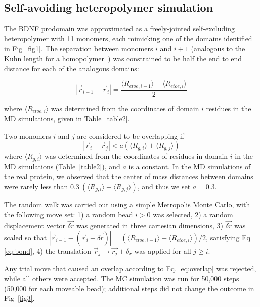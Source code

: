 \documentclass[10pt,letterpaper]{article}
\begin{document}
\subsection*{Self-avoiding heteropolymer simulation} 
The BDNF prodomain was approximated as a freely-jointed self-excluding heteropolymer with 11 monomers, each mimicking one of the domains identified in Fig~\ref{fig1}. The separation between monomers $i$ and $i+1$ (analogous to the Kuhn length for a homopolymer~\cite{Rubinstein2003}) was constrained to be half the end to end distance for each of the analogous domains:

\begin{equation}|\vec{r}_{i-1} - \vec{r}_i| = \frac{\langle R_{etoe,i-1}\rangle + \langle R_{etoe,i}\rangle }{2}\label{eq:bond}\end{equation}

where $\langle R_{etoe,i}\rangle$ was determined from the coordinates of domain $i$ residues in the MD simulations, given in Table~\ref{table2}.

Two monomers $i$ and $j$ are considered to be overlapping if \begin{equation}|\vec{r}_i- \vec{r}_j| < a (\langle R_{g, i}\rangle + \langle R_{g, j}\rangle)\label{eq:overlap}\end{equation} where $\langle R_{g, i}\rangle$ was determined from the coordinates of residues in domain $i$ in the MD simulations (Table~\ref{table2}), and $a$ is a constant. In the MD simulations of the real protein, we observed that the center of mass distances between domains were rarely less than $0.3~(\langle R_{g, i}\rangle + \langle R_{g, j}\rangle)$, and thus we set $a =0.3$.

The random walk was carried out using a simple Metropolis Monte Carlo, with the following move set: 1) a random bead $i>0$ was selected, 2) a random displacement vector $\vec{\delta r}$ was generated in three cartesian dimensions, 3) $\vec{\delta r}$ was scaled so that $|\vec{r}_{i-1} - (\vec{r}_i + \vec{\delta r})| =( \langle R_{etoe,i-1}\rangle + \langle R_{etoe,i}\rangle)/2$, satisfying Eq \ref{eq:bond}, 4) the translation $\vec{r}_j \rightarrow \vec{r_j} + \delta_r$ was applied for all $j\ge i$.

Any trial move that caused an overlap according to Eq. \ref{eq:overlap} was rejected, while all others were accepted. The MC simulation was run for 50,000 steps (50,000 for each moveable bead); additional steps did not change the outcome in Fig~\ref{fig3}.
\end{document}
